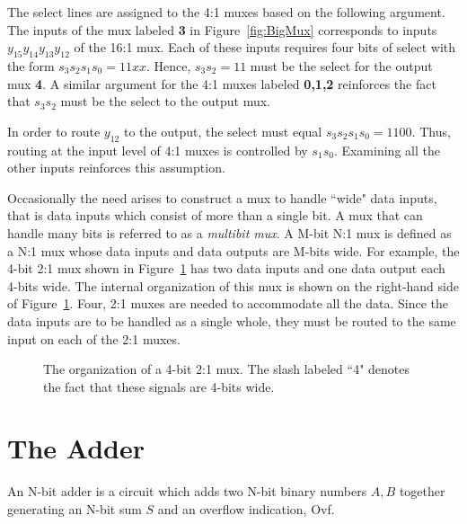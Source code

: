 The select lines are assigned to the 4:1 muxes based on the following 
argument.  The inputs of the mux labeled {\bf 3} in
Figure~\ref{fig:BigMux} corresponds to inputs $y_{15} y_{14} y_{13} y_{12}$ 
of the 16:1 mux.  Each of these inputs requires four bits of 
select with the form $s_3 s_2 s_1 s_0 = 11xx$.  Hence, $s_3 s_2 = 11$ 
must be the select for the output mux {\bf 4}.  
A similar argument for the 4:1
muxes labeled {\bf 0,1,2} reinforces the fact that $s_3 s_2$ must be 
the select to the output mux.

In order to route $y_{12}$ to the output, the select must equal
$s_3 s_2 s_1 s_0 = 1100$.  Thus, routing at the input level of 4:1 
muxes is controlled by $s_1 s_0$.  Examining all the other 
inputs reinforces this assumption.

Occasionally the need arises to construct a mux to handle
``wide" data inputs, that is data inputs which consist of more than
a single bit.  A mux that can handle many bits is referred to 
as a {\it multibit mux}.  \label{multibit mux} A M-bit N:1 mux is 
defined as a N:1 mux whose data inputs and data outputs are M-bits
wide.  For example, the 4-bit 2:1 mux shown in Figure~\ref{fig:4x2x1mux} 
has two data inputs and one data output each 4-bits wide.  The internal
organization of this mux is shown on the right-hand side of 
Figure~\ref{fig:4x2x1mux}.  Four, 2:1 muxes are needed to 
accommodate all the data.  Since the data inputs are to 
be handled as a single whole, they must be routed to the
same input on each of the 2:1 muxes.
\label{page:wmu}

\begin{figure}[ht]
\caption{The organization of a 4-bit 2:1 mux.  The slash labeled ``4" 
denotes the fact that these signals are 4-bits wide.}
\label{fig:4x2x1mux}
\end{figure}


\section{The Adder}
An N-bit adder is a circuit which adds two N-bit binary numbers 
$A,B$ together generating an N-bit sum $S$ and an overflow 
indication, Ovf.   


